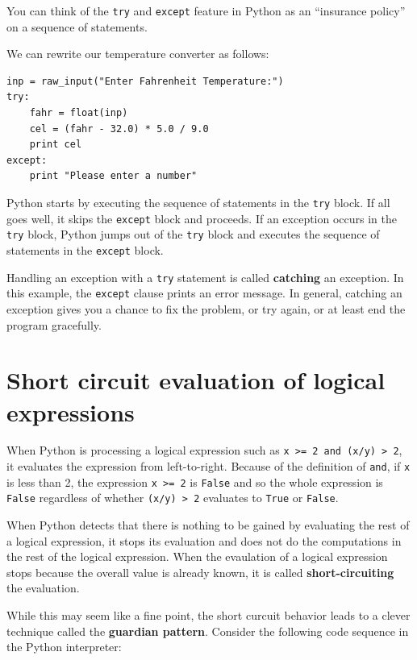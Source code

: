 \documentclass[10pt]{book}
\begin{document}
You can think of the {\tt try} and {\tt except} feature
in Python as an ``insurance policy'' on a sequence of
statements.

We can rewrite our temperature converter as follows:

\beforeverb
\begin{verbatim}
inp = raw_input("Enter Fahrenheit Temperature:")
try:
    fahr = float(inp)
    cel = (fahr - 32.0) * 5.0 / 9.0
    print cel
except:
    print "Please enter a number"
\end{verbatim}
\afterverb
%

Python starts by executing the 
sequence of statements in the 
{\tt try} block.  If all goes
well, it skips the {\tt except} block and proceeds.  If an
exception occurs in the {\tt try} block, 
Python jumps out of the {\tt try} block and
executes the sequence of statements in the {\tt except} block.

Handling an exception with a {\tt try} statement is called {\bf
catching} an exception.  In this example, the {\tt except} clause
prints an error message.  In general,
catching an exception gives you a chance to fix the problem, or try
again, or at least end the program gracefully.

\section{Short circuit evaluation of logical expressions}

When Python is processing a logical expression such as 
{\tt x >= 2 and (x/y) > 2}, it evaluates the expression
from left-to-right.  Because of the definition of {\tt and},
if {\tt x} is less than 2, the expression {\tt x >= 2} is 
{\tt False} and so the whole expression is {\tt False} regardless
of whether {\tt (x/y) > 2} evaluates to {\tt True} or {\tt False}.

When Python detects that there is nothing to be gained by evaluating
the rest of a logical expression, it stops its evaluation and does
not do the computations in the rest of the logical expression.  
When the evaulation of a logical expression stops because the overall
value is already known, it is called {\bf short-circuiting} 
the evaluation.

While this may seem like a fine point, the short curcuit behavior
leads to a clever technique called the {\bf guardian pattern}.  
Consider the following code sequence in the Python interpreter:
\end{document}
